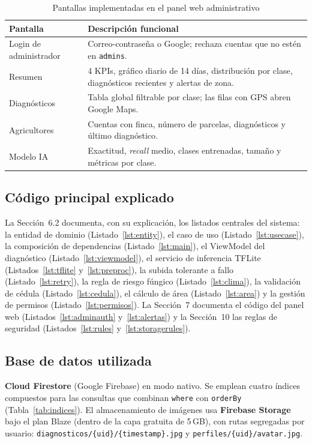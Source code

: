 \documentclass[12pt,a4paper]{article}
\begin{document}
\begin{table}[H]
\centering
\caption{Pantallas implementadas en el panel web administrativo}
\label{tab:pantallasweb}
\renewcommand{\arraystretch}{1.3}
\begin{tabular}{p{4.3cm} p{8.9cm}}
\toprule
\bfseries Pantalla & \bfseries Descripción funcional \\
\midrule
Login de administrador & Correo-contraseña o Google; rechaza cuentas que no estén en \texttt{admins}. \\
Resumen & 4 KPIs, gráfico diario de 14 días, distribución por clase, diagnósticos recientes y alertas de zona. \\
Diagnósticos & Tabla global filtrable por clase; las filas con GPS abren Google Maps. \\
Agricultores & Cuentas con finca, número de parcelas, diagnósticos y último diagnóstico. \\
Modelo IA & Exactitud, \textit{recall} medio, clases entrenadas, tamaño y métricas por clase. \\
\bottomrule
\end{tabular}
\end{table}

\subsection{Código principal explicado}

La Sección~6.2 documenta, con su explicación, los listados centrales del
sistema: la entidad de dominio (Listado~\ref{lst:entity}), el caso de uso
(Listado~\ref{lst:usecase}), la composición de dependencias
(Listado~\ref{lst:main}), el ViewModel del diagnóstico
(Listado~\ref{lst:viewmodel}), el servicio de inferencia TFLite
(Listados~\ref{lst:tflite} y~\ref{lst:preproc}), la subida tolerante a fallo
(Listado~\ref{lst:retry}), la regla de riesgo fúngico (Listado~\ref{lst:clima}),
la validación de cédula (Listado~\ref{lst:cedula}), el cálculo de área
(Listado~\ref{lst:area}) y la gestión de permisos (Listado~\ref{lst:permisos}).
La Sección~7 documenta el código del panel web (Listados~\ref{lst:adminauth}
y~\ref{lst:alertas}) y la Sección~10 las reglas de seguridad
(Listados~\ref{lst:rules} y~\ref{lst:storagerules}).

\subsection{Base de datos utilizada}

\textbf{Cloud Firestore} (Google Firebase) en modo nativo. Se emplean cuatro
índices compuestos para las consultas que combinan \texttt{where} con
\texttt{orderBy} (Tabla~\ref{tab:indices}). El almacenamiento de imágenes usa
\textbf{Firebase Storage} bajo el plan Blaze (dentro de la capa gratuita de
5\,GB), con rutas segregadas por usuario:
\texttt{diagnosticos/\{uid\}/\{timestamp\}.jpg} y
\texttt{perfiles/\{uid\}/avatar.jpg}.
\end{document}
